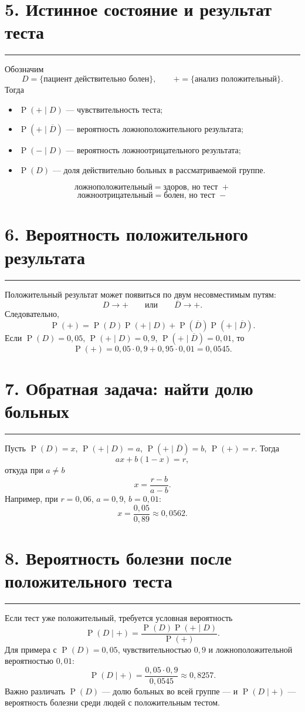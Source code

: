 \documentclass[a4paper,12pt]{article}
\newcommand{\sectionrule}{\vspace{-0.4em}\textcolor{accent}{\rule{\linewidth}{0.7pt}}\vspace{0.4em}}
\newcommand{\prob}[1]{\operatorname{P}\!\left(#1\right)}
\begin{document}
\newpage
\section*{5. Истинное состояние и результат теста}
\sectionrule
Обозначим
\[
D=\{\text{пациент действительно болен}\},\qquad +=\{\text{анализ положительный}\}.
\]
Тогда
\begin{itemize}
\item \(\prob{+\mid D}\) --- чувствительность теста;
\item \(\prob{+\mid\overline D}\) --- вероятность ложноположительного результата;
\item \(\prob{-\mid D}\) --- вероятность ложноотрицательного результата;
\item \(\prob{D}\) --- доля действительно больных в рассматриваемой группе.
\end{itemize}
\[
\boxed{\text{ложноположительный} = \text{здоров, но тест }+}
\]
\[
\boxed{\text{ложноотрицательный} = \text{болен, но тест }-}
\]

\section*{6. Вероятность положительного результата}
\sectionrule
Положительный результат может появиться по двум несовместимым путям:
\[
D\to +\qquad\text{или}\qquad\overline D\to +.
\]
Следовательно,
\[
\boxed{\prob{+}=\prob{D}\prob{+\mid D}+\prob{\overline D}\prob{+\mid\overline D}}.
\]
Если \(\prob{D}=0{,}05\), \(\prob{+\mid D}=0{,}9\), \(\prob{+\mid\overline D}=0{,}01\), то
\[
\prob{+}=0{,}05\cdot0{,}9+0{,}95\cdot0{,}01=0{,}0545.
\]

\section*{7. Обратная задача: найти долю больных}
\sectionrule
Пусть \(\prob{D}=x\), \(\prob{+\mid D}=a\), \(\prob{+\mid\overline D}=b\), \(\prob{+}=r\). Тогда
\[
ax+b(1-x)=r,
\]
откуда при \(a\ne b\)
\[
\boxed{x=\frac{r-b}{a-b}}.
\]
Например, при \(r=0{,}06\), \(a=0{,}9\), \(b=0{,}01\):
\[
x=\frac{0{,}05}{0{,}89}\approx0{,}0562.
\]

\section*{8. Вероятность болезни после положительного теста}
\sectionrule
Если тест уже положительный, требуется условная вероятность
\[
\prob{D\mid +}=\frac{\prob{D}\prob{+\mid D}}{\prob{+}}.
\]
Для примера с \(\prob{D}=0{,}05\), чувствительностью \(0{,}9\) и ложноположительной вероятностью \(0{,}01\):
\[
\prob{D\mid +}=\frac{0{,}05\cdot0{,}9}{0{,}0545}\approx0{,}8257.
\]
Важно различать \(\prob{D}\) --- долю больных во всей группе --- и \(\prob{D\mid +}\) --- вероятность болезни среди людей с положительным тестом.
\end{document}
